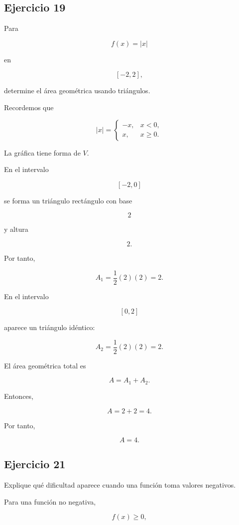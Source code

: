\documentclass[12pt]{article}
\begin{document}
\subsection*{Ejercicio 19}

Para

\[
f(x)=|x|
\]

en

\[
[-2,2],
\]

determine el área geométrica usando triángulos.

Recordemos que

\[
|x|=
\begin{cases}
-x, & x<0,\\
x, & x\geq0.
\end{cases}
\]

La gráfica tiene forma de \(V\).

En el intervalo

\[
[-2,0]
\]

se forma un triángulo rectángulo con base

\[
2
\]

y altura

\[
2.
\]

Por tanto,

\[
A_1=
\frac12(2)(2)=2.
\]

En el intervalo

\[
[0,2]
\]

aparece un triángulo idéntico:

\[
A_2=
\frac12(2)(2)=2.
\]

El área geométrica total es

\[
A=A_1+A_2.
\]

Entonces,

\[
A=2+2=4.
\]

Por tanto,

\[
\boxed{A=4}.
\]

\subsection*{Ejercicio 21}

Explique qué dificultad aparece cuando una función toma valores
negativos.

Para una función no negativa,

\[
f(x)\geq0,
\]
\end{document}
